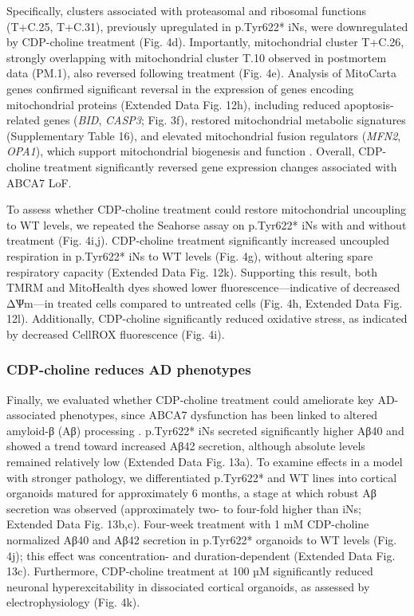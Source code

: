 Specifically, clusters associated with proteasomal and ribosomal functions (T+C.25, T+C.31), previously upregulated in p.Tyr622* iNs, were downregulated by CDP-choline treatment (Fig. 4d). Importantly, mitochondrial cluster T+C.26, strongly overlapping with mitochondrial cluster T.10 observed in postmortem data (PM.1), also reversed following treatment (Fig. 4e). Analysis of MitoCarta genes confirmed significant reversal in the expression of genes encoding mitochondrial proteins (Extended Data Fig. 12h), including reduced apoptosis-related genes (\textit{BID}, \textit{CASP3}; Fig. 3f), restored mitochondrial metabolic signatures (Supplementary Table 16), and elevated mitochondrial fusion regulators (\textit{MFN2}, \textit{OPA1}), which support mitochondrial biogenesis and function \supercite{Westermann2010-au}. Overall, CDP-choline treatment significantly reversed gene expression changes associated with ABCA7 LoF.

To assess whether CDP-choline treatment could restore mitochondrial uncoupling to WT levels, we repeated the Seahorse assay on p.Tyr622* iNs with and without treatment (Fig. 4i,j). CDP-choline treatment significantly increased uncoupled respiration in p.Tyr622* iNs to WT levels (Fig. 4g), without altering spare respiratory capacity (Extended Data Fig. 12k). Supporting this result, both TMRM and MitoHealth dyes showed lower fluorescence—indicative of decreased ΔѰm—in treated cells compared to untreated cells (Fig. 4h, Extended Data Fig. 12l). Additionally, CDP-choline significantly reduced oxidative stress, as indicated by decreased CellROX fluorescence (Fig. 4i).

\subsubsection{ CDP-choline reduces AD phenotypes}
Finally, we evaluated whether CDP-choline treatment could ameliorate key AD-associated phenotypes, since ABCA7 dysfunction has been linked to altered amyloid-β (Aβ) processing \supercite{Satoh2015-yu,Sakae2016-uy,Bamji-Mirza2018-xt,Chan2008-qu,De_Roeck2018-fw}. p.Tyr622* iNs secreted significantly higher Aβ40 and showed a trend toward increased Aβ42 secretion, although absolute levels remained relatively low (Extended Data Fig. 13a). To examine effects in a model with stronger pathology, we differentiated p.Tyr622* and WT lines into cortical organoids matured for approximately 6 months, a stage at which robust Aβ secretion was observed (approximately two- to four-fold higher than iNs; Extended Data Fig. 13b,c). Four-week treatment with 1 mM CDP-choline normalized Aβ40 and Aβ42 secretion in p.Tyr622* organoids to WT levels (Fig. 4j); this effect was concentration- and duration-dependent (Extended Data Fig. 13c). Furthermore, CDP-choline treatment at 100 µM significantly reduced neuronal hyperexcitability in dissociated cortical organoids, as assessed by electrophysiology (Fig. 4k).
